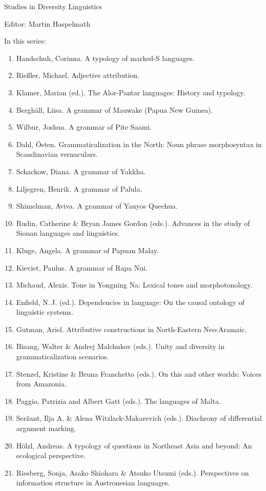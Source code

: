 {\large Studies in Diversity Linguistics}

\bigskip

Editor: Martin Haspelmath  

 
\bigskip 
In this series:


\small
\begin{enumerate}
\item Handschuh, Corinna. A typology of marked-S languages.
\item Rießler, Michael. Adjective attribution.
\item Klamer, Marian (ed.). The Alor-Pantar languages: History and typology.
\item Berghäll, Liisa. A grammar of Mauwake (Papua New Guinea).
\item Wilbur, Joshua. A grammar of Pite Saami.
\item Dahl, Östen. Grammaticalization in the North: Noun phrase morphosyntax in Scandinavian vernaculars.
\item Schackow, Diana.    A grammar of Yakkha.
\item Liljegren, Henrik. A grammar of Palula.
\item Shimelman, Aviva. A grammar of Yauyos Quechua.
\item Rudin, Catherine \& Bryan James Gordon (eds.). Advances in the study of Siouan languages and linguistics.
\item Kluge, Angela. A grammar of Papuan Malay.
\item Kieviet, Paulus. A grammar of Rapa Nui.
\item Michaud, Alexis. Tone in Yongning Na: Lexical tones and morphotonology.
\item Enfield, N.\,J. (ed.).  Dependencies in language: On the causal ontology of linguistic systems.
\item Gutman, Ariel. Attributive constructions in North-Eastern Neo-Aramaic.
\item Bisang, Walter \& Andrej Malchukov (eds.). Unity and diversity in grammaticalization scenarios.
\item Stenzel, Kristine \& Bruna Franchetto (eds.). On this and other worlds: Voices from Amazonia.
\item Paggio, Patrizia and Albert Gatt (eds.). The languages of Malta.
\item Seržant, Ilja A.  \& Alena Witzlack-Makarevich (eds.). Diachrony of differential argument marking.
\item Hölzl, Andreas. A typology of questions in Northeast Asia and beyond: An ecological perspective.
\item Riesberg, Sonja,  Asako Shiohara \& Atsuko Utsumi (eds.). Perspectives on information structure in Austronesian languages.
\end{enumerate}
 
